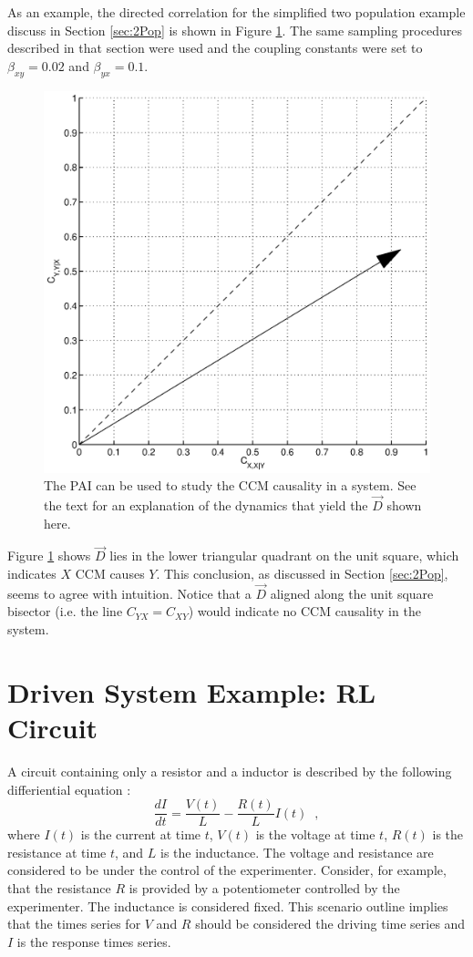 \documentclass[a4paper,11pt]{article}
\begin{document}
As an example, the directed correlation for the simplified two population example discuss in Section \ref{sec:2Pop} is shown in Figure \ref{fig:}.  The same sampling procedures described in that section were used and the coupling constants were set to $\beta_{xy}=0.02$ and $\beta_{yx}=0.1$.
\begin{figure}[ht]
\label{fig:}
\includegraphics[scale=0.45]{Figure3.eps}
\caption{The PAI can be used to study the CCM causality in a system.  See the text for an explanation of the dynamics that yield the $\vec{D}$ shown here.}
\end{figure}
Figure \ref{fig:} shows $\vec{D}$ lies in the lower triangular quadrant on the unit square, which indicates $X$ CCM causes $Y$.  This conclusion, as discussed in Section \ref{sec:2Pop}, seems to agree with intuition.  Notice that a $\vec{D}$ aligned along the unit square bisector (i.e. the line $C_{YX}=C_{XY}$) would indicate no CCM causality in the system.

\section{Driven System Example: RL Circuit}
A circuit containing only a resistor and a inductor is described by the following differiential equation \cite{halliday2013}:
\begin{equation}
\label{eqn:it}
\frac{dI}{dt} = \frac{V(t)}{L} - \frac{R(t)}{L} I(t)\;\;,
\end{equation}
where $I(t)$ is the current at time $t$, $V(t)$ is the voltage at time $t$, $R(t)$ is the resistance at time $t$, and $L$ is the inductance.  The voltage and resistance are considered to be under the control of the experimenter.  Consider, for example, that the resistance $R$ is provided by a potentiometer controlled by the experimenter.  The inductance is considered fixed.  This scenario outline implies that the times series for $V$ and $R$ should be considered the driving time series and $I$ is the response times series.  
\end{document}
